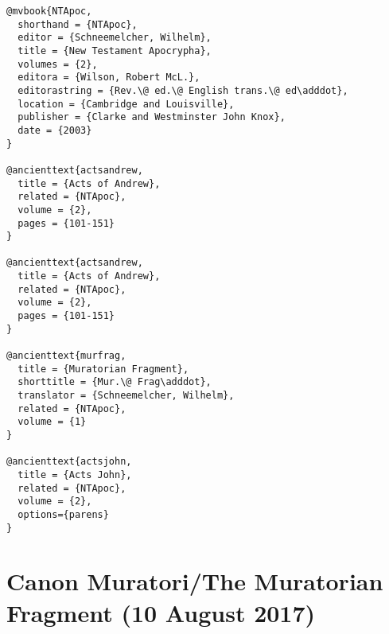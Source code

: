 \documentclass[a4paper]{article}
\renewcommand\footnote[1]{##1}%
\begin{document}
\begin{verbatim}
@mvbook{NTApoc,
  shorthand = {NTApoc},
  editor = {Schneemelcher, Wilhelm},
  title = {New Testament Apocrypha},
  volumes = {2},
  editora = {Wilson, Robert McL.},
  editorastring = {Rev.\@ ed.\@ English trans.\@ ed\adddot},
  location = {Cambridge and Louisville},
  publisher = {Clarke and Westminster John Knox},
  date = {2003}
}

@ancienttext{actsandrew,
  title = {Acts of Andrew},
  related = {NTApoc},
  volume = {2},
  pages = {101-151}
}

@ancienttext{actsandrew,
  title = {Acts of Andrew},
  related = {NTApoc},
  volume = {2},
  pages = {101-151}
}

@ancienttext{murfrag,
  title = {Muratorian Fragment},
  shorttitle = {Mur.\@ Frag\adddot},
  translator = {Schneemelcher, Wilhelm},
  related = {NTApoc},
  volume = {1}
}

@ancienttext{actsjohn,
  title = {Acts John},
  related = {NTApoc},
  volume = {2},
  options={parens}
}
\end{verbatim}

\begin{fverbcite}{22}
  \autocite[For Lycomedes’s lament over his wife Cleopatra’s paralysis,
  see][(20)173]{actsjohn}
\end{fverbcite}
\exampleancientsources
\examplesecondarysources
{}

\section{Canon Muratori/The Muratorian Fragment (10 August 2017)}
\end{document}
